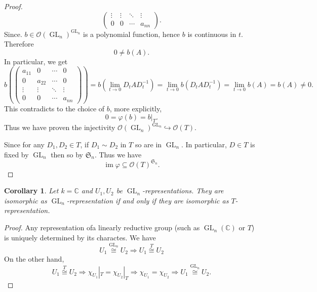 \documentclass[10pt]{article}
\newtheorem{corollary}{Corollary} [section]
\numberwithin{equation}{theorem}
\DeclareMathOperator{\GL}{GL}
\DeclareMathOperator{\Image}{im}
\newcommand{\Ouv}[0]{\mathcal{O}}
\newcommand{\C}[0]{\mathbb{C}}
\begin{document}
\begin{proof}
\begin{equation*}
\begin{pmatrix}
      \vdots & \vdots & \ddots & \vdots\\
      0 & 0 & \cdots & a_{nn}
  \end{pmatrix}.
  \end{equation*}
  Since. $b\in\Ouv(\GL_n)^{\GL_n}$ is a polynomial function, hence $b$ is continuous in $t$. Therefore 
  \begin{equation*}
    0\not= b(A).
  \end{equation*}
  In particular, we get 
  \begin{equation*}
    b\left(\begin{pmatrix}
      a_{11} & 0&\cdots& 0 \\
      0 & a_{22} & \cdots& 0 \\
      \vdots & \vdots & \ddots & \vdots\\
      0 & 0 & \cdots & a_{nn}
  \end{pmatrix}\right)= b(\lim_{t\to0}D_tAD_t^{-1}) = \lim_{t\to 0}b(D_tAD_t^{-1})=\lim_{t\to 0}b(A) = b(A) \not =0.
  \end{equation*}
  This contradicts to the choice of $b$, more explicitly,
  \begin{equation*}
    0 = \varphi(b) = b|_T.
  \end{equation*}
  Thus we have proven the injectivity $\Ouv(\GL_n)^{\GL_n}\hookrightarrow \Ouv(T)$.
  \par Since for any $D_1,D_2\in T$, if $D_1\sim D_2$ in $T$ so are in $\GL_n$. In particular, $D\in T$ is fixed by $\GL_n$ then so by $\mathfrak{S}_n$. Thus we have 
  \begin{equation*}
    \Image\varphi\subseteq\Ouv(T)^{\mathfrak{S}_n}.
  \end{equation*}
\end{proof}
\begin{corollary}
  Let $k=\C$ and $U_1,U_2$ be $\GL_n$-representations. They are isomorphic as $\GL_n$-representation if and only if they are isomorphic as $T$-representation.
\end{corollary}
\begin{proof}
  Any representation ofa linearly reductive group (such as $\GL_n(\C)$ or $T$) is uniquely determined by its charactes. We have 
  \begin{equation*}
    U_1\stackrel{\GL_n}{\cong} U_2\Rightarrow U_1\stackrel{T}{\cong} U_2
  \end{equation*}
  On the other hand,
  \begin{equation*}
    U_1\stackrel{T}{\cong} U_2\Rightarrow \chi_{U_1}|_T=\chi_{U_2}|_T\Rightarrow \chi_{U_1}=\chi_{U_2}\Rightarrow U_1\stackrel{\GL_n}{\cong} U_2.
  \end{equation*}
\end{proof}
\end{document}
